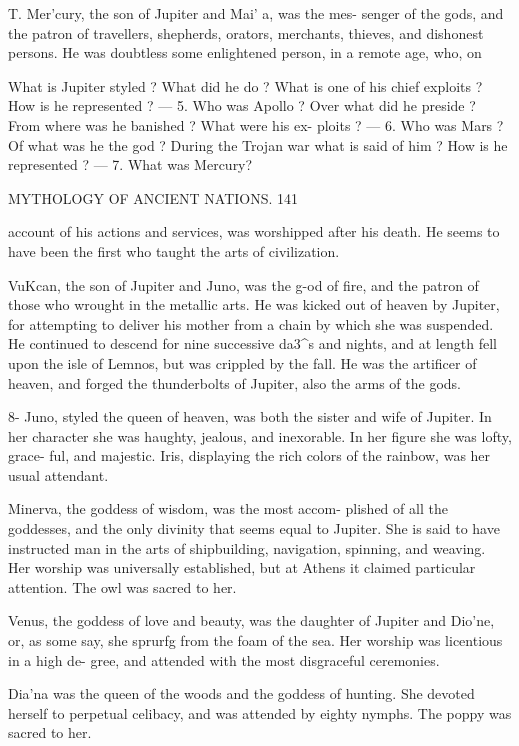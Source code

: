 \documentclass[openany,a4paper]{memoir}
\begin{document}
T. Mer'cury, the son of Jupiter and Mai' a, was the mes- 
senger of the gods, and the patron of travellers, shepherds, 
orators, merchants, thieves, and dishonest persons. He was 
doubtless some enlightened person, in a remote age, who, on 

What is Jupiter styled ? What did he do ? What is one of his chief 
exploits ? How is he represented ? — 5. Who was Apollo ? Over what 
did he preside ? From where was he banished ? What were his ex- 
ploits ? — 6. Who was Mars ? Of what was he the god ? During the 
Trojan war what is said of him ? How is he represented ? — 7. What 
was Mercury? 



MYTHOLOGY OF ANCIENT NATIONS. 141 

account of his actions and services, was worshipped after his 
death. He seems to have been the first who taught the arts 
of civilization. 

VuKcan, the son of Jupiter and Juno, was the g-od of fire, 
and the patron of those who wrought in the metallic arts. 
He was kicked out of heaven by Jupiter, for attempting to 
deliver his mother from a chain by which she was suspended. 
He continued to descend for nine successive da3^s and nights, 
and at length fell upon the isle of Lemnos, but was crippled 
by the fall. He was the artificer of heaven, and forged the 
thunderbolts of Jupiter, also the arms of the gods. 

8- Juno, styled the queen of heaven, was both the sister 
and wife of Jupiter. In her character she was haughty, 
jealous, and inexorable. In her figure she was lofty, grace- 
ful, and majestic. Iris, displaying the rich colors of the 
rainbow, was her usual attendant. 

Minerva, the goddess of wisdom, was the most accom- 
plished of all the goddesses, and the only divinity that seems 
equal to Jupiter. She is said to have instructed man in the 
arts of shipbuilding, navigation, spinning, and weaving. Her 
worship was universally established, but at Athens it claimed 
particular attention. The owl was sacred to her. 

Venus, the goddess of love and beauty, was the daughter 
of Jupiter and Dio'ne, or, as some say, she sprurfg from the 
foam of the sea. Her worship was licentious in a high de- 
gree, and attended with the most disgraceful ceremonies. 

Dia'na was the queen of the woods and the goddess of 
hunting. She devoted herself to perpetual celibacy, and 
was attended by eighty nymphs. The poppy was sacred 
to her. 
\end{document}
